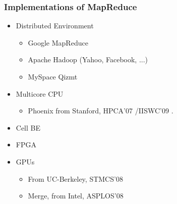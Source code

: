 \begin{frame}
\frametitle{Implementations of MapReduce}
\begin{itemize}
\item<1-> Distributed Environment
\begin{itemize}
\item Google MapReduce
\item Apache Hadoop (Yahoo\!, Facebook, ...)
\item MySpace Qizmt
\end{itemize}
\item<2-> Multi\-core CPU
\begin{itemize}
\item Phoenix from Stanford, HPCA'07 \cite{Ranger2007}/IISWC'09 \cite{Yoo2009}.
\end{itemize}
\item<3-> Cell BE
\item<3-> FPGA
\item<4-> GPUs
\begin{itemize}
\item From UC-Berkeley, STMCS'08 \cite{Kruijf2007}
\item Merge, from Intel, ASPLOS'08 \cite{Linderman2008}
\end{itemize}
\end{itemize}
\end{frame}
